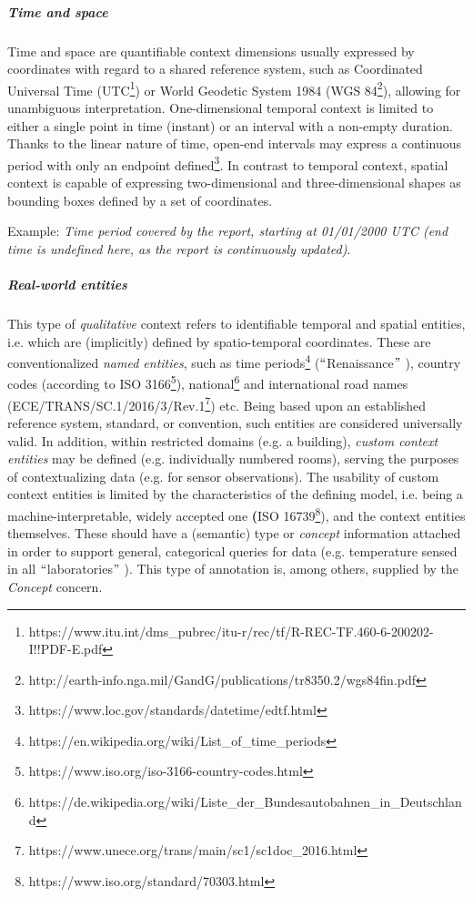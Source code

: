 \subparagraph*{Time and space}
Time and space are quantifiable context dimensions usually expressed by coordinates with regard to a shared reference system, such as Coordinated Universal Time (UTC\footnote{https://www.itu.int/dms\_pubrec/itu-r/rec/tf/R-REC-TF.460-6-200202-I!!PDF-E.pdf }) or World Geodetic System 1984 (WGS 84\footnote{http://earth-info.nga.mil/GandG/publications/tr8350.2/wgs84fin.pdf }), allowing for unambiguous interpretation. One-dimensional temporal context is limited to either a single point in time (instant) or an interval with a non-empty duration. Thanks to the linear nature of time, open-end intervals may express a continuous period with only an endpoint defined\footnote{https://www.loc.gov/standards/datetime/edtf.html }. In contrast to temporal context, spatial context is capable of expressing two-dimensional and three-dimensional shapes as bounding boxes defined by a set of coordinates. 

Example: \textit{Time period covered by the report, starting at 01/01/2000 UTC (end time is undefined here, as the report is continuously updated)}. 


\subparagraph*{Real-world entities}
This type of \textit{qualitative} context refers to identifiable temporal and spatial entities, i.e. which are (implicitly) defined by spatio-temporal coordinates. These are conventionalized \textit{named entities}, such as time periods\footnote{https://en.wikipedia.org/wiki/List\_of\_time\_periods } ($``$Renaissance$"$ ), country codes (according to ISO 3166\footnote{https://www.iso.org/iso-3166-country-codes.html }), national\footnote{https://de.wikipedia.org/wiki/Liste\_der\_Bundesautobahnen\_in\_Deutschland } and international road names (ECE/TRANS/SC.1/2016/3/Rev.1\footnote{https://www.unece.org/trans/main/sc1/sc1doc\_2016.html }) etc. Being based upon an established reference system, standard, or convention, such entities are considered universally valid. In addition, within restricted domains (e.g. a building), \textit{custom context entities} may be defined (e.g. individually numbered rooms), serving the purposes of contextualizing data (e.g. for sensor observations). The usability of custom context entities is limited by the characteristics of the defining model, i.e. being a machine-interpretable, widely accepted one \textbf{(}ISO 16739\footnote{https://www.iso.org/standard/70303.html }), and the context entities themselves. These should have a (semantic) type or \textit{concept} information attached in order to support general, categorical queries for data (e.g. temperature sensed in all $``$laboratories$"$ ). This type of annotation is, among others, supplied by the \textit{Concept }concern. 

